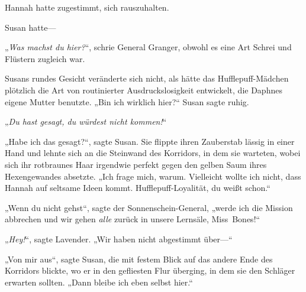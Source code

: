 Hannah hatte zugestimmt, sich rauszuhalten.

Susan hatte—

\later

„\emph{Was machst du hier?}“, schrie General Granger, obwohl es eine Art Schrei und Flüstern zugleich war.

Susans rundes Gesicht veränderte sich nicht, als hätte das Hufflepuff-Mädchen plötzlich die Art von routinierter Ausdruckslosigkeit entwickelt, die Daphnes eigene Mutter benutzte. „Bin ich wirklich hier?“ Susan sagte ruhig.

„\emph{Du hast gesagt, du würdest nicht kommen!}“

„Habe ich das gesagt?“, sagte Susan. Sie flippte ihren Zauberstab lässig in einer Hand und lehnte sich an die Steinwand des Korridors, in dem sie warteten, wobei sich ihr rotbraunes Haar irgendwie perfekt gegen den gelben Saum ihres Hexengewandes absetzte. „Ich frage mich, warum. Vielleicht wollte ich nicht, dass Hannah auf seltsame Ideen kommt. Hufflepuff-Loyalität, du weißt schon.“

„Wenn du nicht gehst“, sagte der Sonnenschein-General, „werde ich die Mission abbrechen und wir gehen \emph{alle} zurück in unsere Lernsäle, Miss~Bones!“

„\emph{Hey!}“, sagte Lavender. „Wir haben nicht abgestimmt über—“

„Von mir aus“, sagte Susan, die mit festem Blick auf das andere Ende des Korridors blickte, wo er in den gefliesten Flur überging, in dem sie den Schläger erwarten sollten. „Dann bleibe ich eben selbst hier.“

